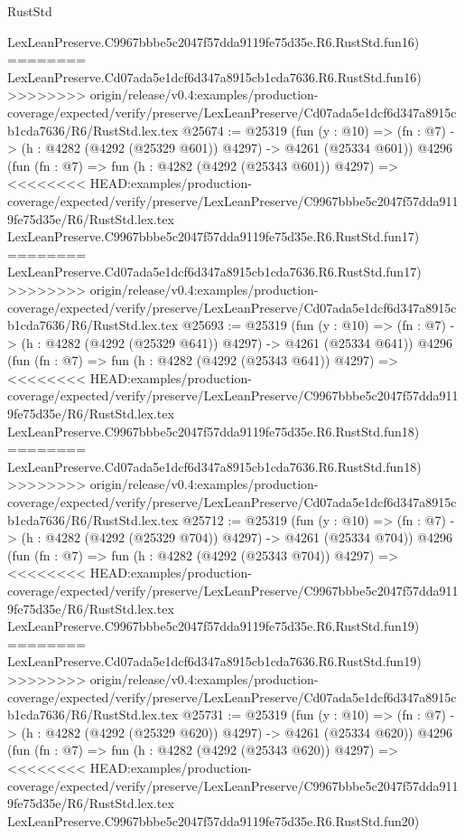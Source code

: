 \begin{lexlean}{RustStd}
\begin{coremodule}
{\begin{coremodule}
{{{{{{{{{{{{{{{{{{{{{{{{{{{{{{{{{{{    LexLeanPreserve.C9967bbbe5c2047f57dda9119fe75d35e.R6.RustStd.fun16)
========
    LexLeanPreserve.Cd07ada5e1dcf6d347a8915cb1cda7636.R6.RustStd.fun16)
>>>>>>>> origin/release/v0.4:examples/production-coverage/expected/verify/preserve/LexLeanPreserve/Cd07ada5e1dcf6d347a8915cb1cda7636/R6/RustStd.lex.tex
@25674 := @25319
    (fun (y : @10) => (fn : @7) -> (h : @4282 (@4292 (@25329 @601)) @4297) -> @4261 (@25334 @601))
    @4296
    (fun (fn : @7) =>
    fun (h : @4282 (@4292 (@25343 @601)) @4297) =>
<<<<<<<< HEAD:examples/production-coverage/expected/verify/preserve/LexLeanPreserve/C9967bbbe5c2047f57dda9119fe75d35e/R6/RustStd.lex.tex
    LexLeanPreserve.C9967bbbe5c2047f57dda9119fe75d35e.R6.RustStd.fun17)
========
    LexLeanPreserve.Cd07ada5e1dcf6d347a8915cb1cda7636.R6.RustStd.fun17)
>>>>>>>> origin/release/v0.4:examples/production-coverage/expected/verify/preserve/LexLeanPreserve/Cd07ada5e1dcf6d347a8915cb1cda7636/R6/RustStd.lex.tex
@25693 := @25319
    (fun (y : @10) => (fn : @7) -> (h : @4282 (@4292 (@25329 @641)) @4297) -> @4261 (@25334 @641))
    @4296
    (fun (fn : @7) =>
    fun (h : @4282 (@4292 (@25343 @641)) @4297) =>
<<<<<<<< HEAD:examples/production-coverage/expected/verify/preserve/LexLeanPreserve/C9967bbbe5c2047f57dda9119fe75d35e/R6/RustStd.lex.tex
    LexLeanPreserve.C9967bbbe5c2047f57dda9119fe75d35e.R6.RustStd.fun18)
========
    LexLeanPreserve.Cd07ada5e1dcf6d347a8915cb1cda7636.R6.RustStd.fun18)
>>>>>>>> origin/release/v0.4:examples/production-coverage/expected/verify/preserve/LexLeanPreserve/Cd07ada5e1dcf6d347a8915cb1cda7636/R6/RustStd.lex.tex
@25712 := @25319
    (fun (y : @10) => (fn : @7) -> (h : @4282 (@4292 (@25329 @704)) @4297) -> @4261 (@25334 @704))
    @4296
    (fun (fn : @7) =>
    fun (h : @4282 (@4292 (@25343 @704)) @4297) =>
<<<<<<<< HEAD:examples/production-coverage/expected/verify/preserve/LexLeanPreserve/C9967bbbe5c2047f57dda9119fe75d35e/R6/RustStd.lex.tex
    LexLeanPreserve.C9967bbbe5c2047f57dda9119fe75d35e.R6.RustStd.fun19)
========
    LexLeanPreserve.Cd07ada5e1dcf6d347a8915cb1cda7636.R6.RustStd.fun19)
>>>>>>>> origin/release/v0.4:examples/production-coverage/expected/verify/preserve/LexLeanPreserve/Cd07ada5e1dcf6d347a8915cb1cda7636/R6/RustStd.lex.tex
@25731 := @25319
    (fun (y : @10) => (fn : @7) -> (h : @4282 (@4292 (@25329 @620)) @4297) -> @4261 (@25334 @620))
    @4296
    (fun (fn : @7) =>
    fun (h : @4282 (@4292 (@25343 @620)) @4297) =>
<<<<<<<< HEAD:examples/production-coverage/expected/verify/preserve/LexLeanPreserve/C9967bbbe5c2047f57dda9119fe75d35e/R6/RustStd.lex.tex
    LexLeanPreserve.C9967bbbe5c2047f57dda9119fe75d35e.R6.RustStd.fun20)
}}}}}}}}}}}}}}}}}}}}}}}}}}}}}}}}}}}
\end{coremodule}}
\end{coremodule}
\end{lexlean}
